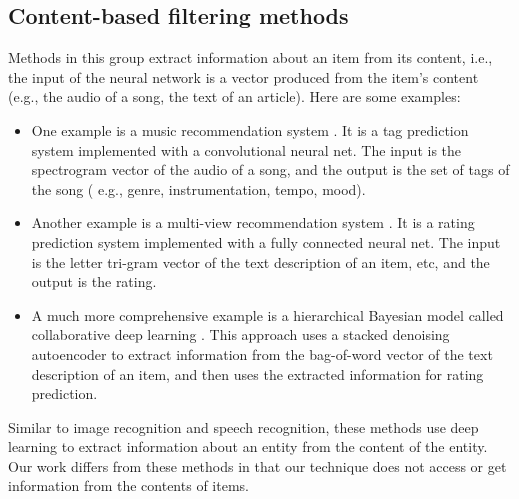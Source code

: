 \documentclass[letterpaper]{article}
\begin{document}
\subsection{Content-based filtering methods}
Methods in this group extract information about an item from its content, 
i.e., the input of the neural network is a vector produced from the item's 
content (e.g., the audio of a song, the text of an article). Here are some 
examples:
\begin{itemize}
	\item One example is a music recommendation system 	\cite{van2013deep}. 
	It is a tag prediction system implemented with a convolutional neural net. 
	The input is the spectrogram vector of the audio of a song,
	and the output 	is the set of tags of the song (
	e.g., genre, instrumentation, tempo, mood).
	\item Another example is a multi-view recommendation system 	
	\cite{elkahky2015multi}. 
	It is a rating prediction system implemented with a fully connected 
	neural net.
	The input is the letter tri-gram vector of the text description of an item, 
	etc, and the output is the rating.
	\item A much more comprehensive example is a hierarchical Bayesian model 
	called collaborative deep learning \cite{wang2015collaborative}.
	This approach uses a stacked denoising autoencoder to extract information 
	from the bag-of-word vector of the text description of an item,
	and then uses the extracted information for rating prediction.
\end{itemize}
Similar to image recognition and speech recognition, these methods use deep 
learning to extract information about an entity from the content of the entity.
Our work differs from these methods in that our technique does not access or 
get information from the contents of items.
\end{document}
